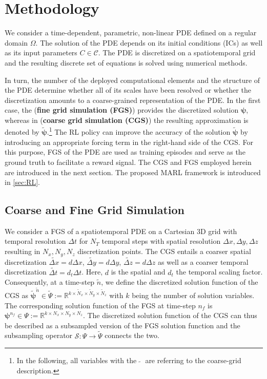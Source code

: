 \documentclass{article}
\theoremstyle{plain}
\theoremstyle{definition}
\theoremstyle{remark}
\begin{document}
\section{Methodology}
We consider a time-dependent, parametric, non-linear PDE defined on a regular domain $\Omega$. The solution of the PDE depends on its initial conditions (ICs) as well as its input parameters $ C \in \mathcal{C}$. The PDE is discretized on a spatiotemporal grid and the resulting discrete set of equations is solved using numerical methods. 

In turn, the number of the deployed computational elements and the structure of the PDE determine whether all of its scales have been resolved or whether the discretization amounts to a coarse-grained representation of the PDE. In the first case, the (\textbf{fine grid simulation (FGS)}) provides the discretized solution $\boldsymbol{\psi}$, whereas in (\textbf{coarse grid simulation (CGS)}) the resulting approximation is denoted by $\tilde{\boldsymbol{\psi}}$.\footnote{ In the following, all variables with the $\;\tilde {}\;$ are referring to the coarse-grid description.} The  RL policy can improve the accuracy of the solution $\tilde{\boldsymbol{\psi}}$ by introducing an appropriate  forcing term in the right-hand side of the CGS. For this purpose, FGS of the PDE are used as training episodes and serve as the ground truth to facilitate a reward signal. The CGS and FGS employed herein are introduced in the next section. The  proposed  MARL framework is introduced in \cref{sec:RL}. 

\subsection{Coarse and Fine Grid Simulation}
We consider a FGS of a spatiotemporal  PDE on a Cartesian  3D grid with temporal resolution $\Delta t$ for $N_T$ temporal steps with spatial resolution $\Delta x, \Delta y , \Delta z$ resulting in  $N_x, N_y, N_z$ discretization points. 
The CGS entails a coarser spatial discretization $  \widetilde{\Delta x}= d \Delta x$, $ \widetilde{\Delta y}= d \Delta y$, $ \widetilde{\Delta z}= d \Delta z$ as well as a coarser temporal discretization $ \widetilde{\Delta t} = d_t \Delta t$. Here, $d$ is the spatial and $d_t$ the temporal scaling factor. Consequently, at a time-step $\tilde{n}$, we define the discretized solution function of the CGS as $\tilde{\boldsymbol{\psi}} ^{\tilde{n}} \in \tilde \Psi := \mathbb R^{k \times \tilde N_x \times \tilde N_y \times \tilde N_z}$ with $k$ being the number of solution variables. The corresponding solution function of the FGS at time-step $n_f$ is $\boldsymbol{\psi}^{n_f} \in  \Psi := \mathbb R^{k \times N_x \times N_y \times N_z}$. The discretized solution function of the CGS can thus be described as a subsampled version of the FGS solution function and the subsampling operator $\mathcal S:  \Psi \rightarrow \tilde \Psi $ connects the two.
\end{document}
